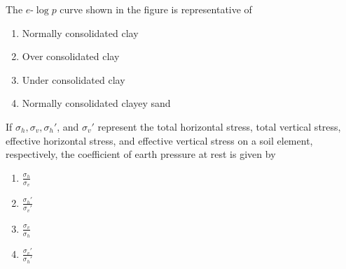 \iffalse
\chapter{2010}
\author{AI24BTECH11031}
\section{ce}
\fi

\item The $e$-$\log p$ curve shown in the figure is representative of 

    \begin{center}
    \end{center}


    \begin{multicols}{2}
        \begin{enumerate}
            \item Normally consolidated clay
            \item Over consolidated clay
            \item Under consolidated clay
            \item Normally consolidated clayey sand
        \end{enumerate}
    \end{multicols}

\item If $\sigma_h, \sigma_v, \sigma_h'$, and $\sigma_v'$ represent the total horizontal stress,
total vertical stress, effective horizontal stress, and effective vertical stress on a soil
element, respectively, the coefficient of earth pressure at rest is given by  

    \begin{multicols}{4}
        \begin{enumerate}
            \item $\frac{\sigma_h}{\sigma_v}$
            \item $\frac{\sigma_h'}{\sigma_v'}$
            \item $\frac{\sigma_v}{\sigma_h}$
            \item $\frac{\sigma_v'}{\sigma_h'}$
        \end{enumerate}
    \end{multicols}


